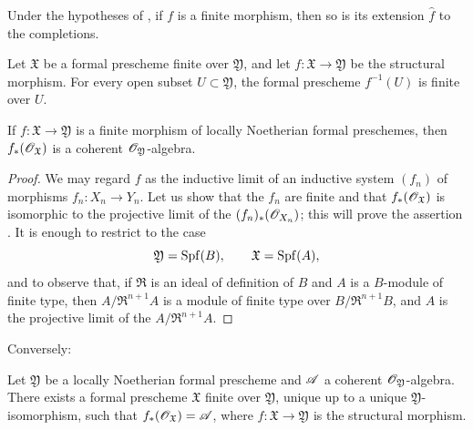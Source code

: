\begin{corollary}[4.8.4]
\label{III.4.8.4}
Under the hypotheses of , if $f$ is a finite
morphism, then so is its extension $\widehat{f}$ to the
completions.
\end{corollary}

\begin{corollary}[4.8.5]
\label{III.4.8.5}
Let $\mathfrak{X}$ be a formal prescheme finite over
$\mathfrak{Y}$, and let
$f:\mathfrak{X}\to\mathfrak{Y}$ be the structural morphism.  For
every open subset $U\subset\mathfrak{Y}$, the formal prescheme
$f^{-1}(U)$ is finite over $U$.
\end{corollary}

\begin{proposition}[4.8.6]
\label{III.4.8.6}
If $f:\mathfrak{X}\to\mathfrak{Y}$ is a finite morphism of locally
Noetherian formal preschemes, then
$f_*(\mathscr{O}_{\mathfrak{X}})$ is a coherent
$\mathscr{O}_{\mathfrak{Y}}$-algebra.
\end{proposition}

\begin{proof}
We may regard $f$ as the inductive limit of an inductive system
$(f_n)$ of morphisms $f_n:X_n\to Y_n$.  Let us show that the
$f_n$ are finite and that $f_*(\mathscr{O}_{\mathfrak{X}})$ is
isomorphic to the projective limit of the
$(f_n)_*(\mathscr{O}_{X_n})$; this will prove the assertion
.  It is enough to restrict to the case
\[
  \mathfrak{Y}=\operatorname{Spf}(B),\qquad \mathfrak{X}=\operatorname{Spf}(A),
\]
and to observe that, if $\mathfrak{R}$ is an ideal of definition
of $B$ and $A$ is a $B$-module of finite type, then
$A/\mathfrak{R}^{n+1}A$ is a module of finite type over
$B/\mathfrak{R}^{n+1}B$, and $A$ is the projective limit of the
$A/\mathfrak{R}^{n+1}A$.
\end{proof}

Conversely:

\begin{proposition}[4.8.7]
\label{III.4.8.7}
Let $\mathfrak{Y}$ be a locally Noetherian formal prescheme and
$\mathscr{A}$ a coherent $\mathscr{O}_{\mathfrak{Y}}$-algebra.  There exists
a formal prescheme $\mathfrak{X}$ finite over $\mathfrak{Y}$,
unique up to a unique $\mathfrak{Y}$-isomorphism, such that $f_*(\mathscr{O}_{\mathfrak{X}})=\mathscr{A}$,
where $f:\mathfrak{X}\to\mathfrak{Y}$ is the structural morphism.
\end{proposition}

